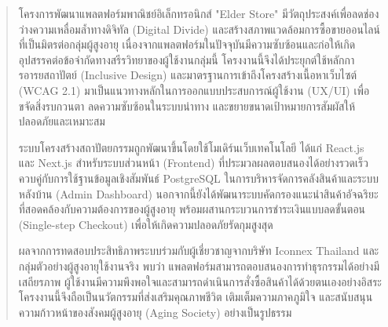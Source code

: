 \maketitle
\makesignature

\ifproject
\begin{abstract}
\par
โครงการพัฒนาแพลตฟอร์มพาณิชย์อิเล็กทรอนิกส์ "Elder Store" มีวัตถุประสงค์เพื่อลดช่องว่างความเหลื่อมล้ำทางดิจิทัล (Digital Divide) และสร้างสภาพแวดล้อมการซื้อขายออนไลน์ที่เป็นมิตรต่อกลุ่มผู้สูงอายุ เนื่องจากแพลตฟอร์มในปัจจุบันมีความซับซ้อนและก่อให้เกิดอุปสรรคต่อข้อจำกัดทางสรีรวิทยาของผู้ใช้งานกลุ่มนี้ โครงงานนี้จึงได้ประยุกต์ใช้หลักการอารยสถาปัตย์ (Inclusive Design) และมาตรฐานการเข้าถึงโครงสร้างเนื้อหาเว็บไซต์ (WCAG 2.1) มาเป็นแนวทางหลักในการออกแบบประสบการณ์ผู้ใช้งาน (UX/UI) เพื่อขจัดสิ่งรบกวนตา ลดความซับซ้อนในระบบนำทาง และขยายขนาดเป้าหมายการสัมผัสให้ปลอดภัยและเหมาะสม

\par
ระบบโครงสร้างสถาปัตยกรรมถูกพัฒนาขึ้นโดยใช้โมเดิร์นเว็บเทคโนโลยี ได้แก่ React.js และ Next.js สำหรับระบบส่วนหน้า (Frontend) ที่ประมวลผลตอบสนองได้อย่างรวดเร็ว ควบคู่กับการใช้ฐานข้อมูลเชิงสัมพันธ์ PostgreSQL ในการบริหารจัดการคลังสินค้าและระบบหลังบ้าน (Admin Dashboard) นอกจากนี้ยังได้พัฒนาระบบคัดกรองแนะนำสินค้าอัจฉริยะที่สอดคล้องกับความต้องการของผู้สูงอายุ พร้อมผสานกระบวนการชำระเงินแบบลดขั้นตอน (Single-step Checkout) เพื่อให้เกิดความปลอดภัยรัดกุมสูงสุด

\par
ผลจากการทดสอบประสิทธิภาพระบบร่วมกับผู้เชี่ยวชาญจากบริษัท Iconnex Thailand และกลุ่มตัวอย่างผู้สูงอายุใช้งานจริง พบว่า แพลตฟอร์มสามารถตอบสนองการทำธุรกรรมได้อย่างมีเสถียรภาพ ผู้ใช้งานมีความพึงพอใจและสามารถดำเนินการสั่งซื้อสินค้าได้ด้วยตนเองอย่างอิสระ โครงงานนี้จึงถือเป็นนวัตกรรมที่ส่งเสริมคุณภาพชีวิต เติมเต็มความภาคภูมิใจ และสนับสนุนความก้าวหน้าของสังคมผู้สูงอายุ (Aging Society) อย่างเป็นรูปธรรม
\end{abstract}

